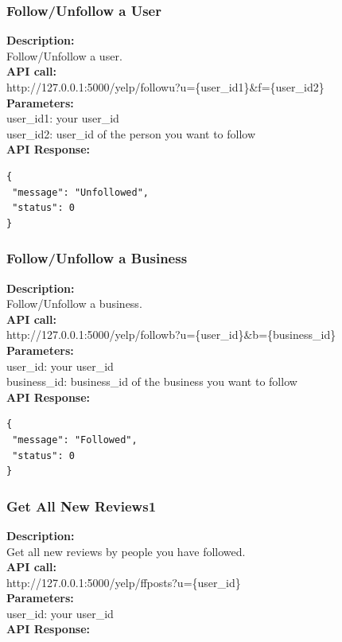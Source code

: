 \documentclass[12pt]{article}
\begin{document}
\subsubsection{Follow/Unfollow a User}
\textbf{Description:}\\
Follow/Unfollow a user.\\
\textbf{API call:}\\
http://127.0.0.1:5000/yelp/followu?u=\{user\_id1\}\&f=\{user\_id2\}\\
\textbf{Parameters:}\\
user\_id1: your user\_id\\
user\_id2: user\_id of the person you want to follow\\
\textbf{API Response:}

\begin{singlespacing}
\begin{lstlisting}
{
 "message": "Unfollowed",
 "status": 0
}
\end{lstlisting}
\end{singlespacing}

\subsubsection{Follow/Unfollow a Business}
\textbf{Description:}\\
Follow/Unfollow a business.\\
\textbf{API call:}\\
http://127.0.0.1:5000/yelp/followb?u=\{user\_id\}\&b=\{business\_id\}\\
\textbf{Parameters:}\\
user\_id: your user\_id\\
business\_id: business\_id of the business you want to follow\\
\textbf{API Response:}

\begin{singlespacing}
\begin{lstlisting}
{
 "message": "Followed",
 "status": 0
}
\end{lstlisting}
\end{singlespacing}

\subsubsection{Get All New Reviews1}
\textbf{Description:}\\
Get all new reviews by people you have followed.\\
\textbf{API call:}\\ 
http://127.0.0.1:5000/yelp/ffposts?u=\{user\_id\}\\
\textbf{Parameters:}\\
user\_id: your user\_id\\
\textbf{API Response:}
\end{document}
